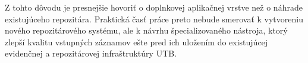 Z tohto dôvodu je presnejšie hovoriť o doplnkovej aplikačnej vrstve než o náhrade existujúceho repozitára. Praktická časť práce preto nebude smerovať k vytvoreniu nového repozitárového systému, ale k návrhu špecializovaného nástroja, ktorý zlepší kvalitu vstupných záznamov ešte pred ich uložením do existujúcej evidenčnej a repozitárovej infraštruktúry UTB.
